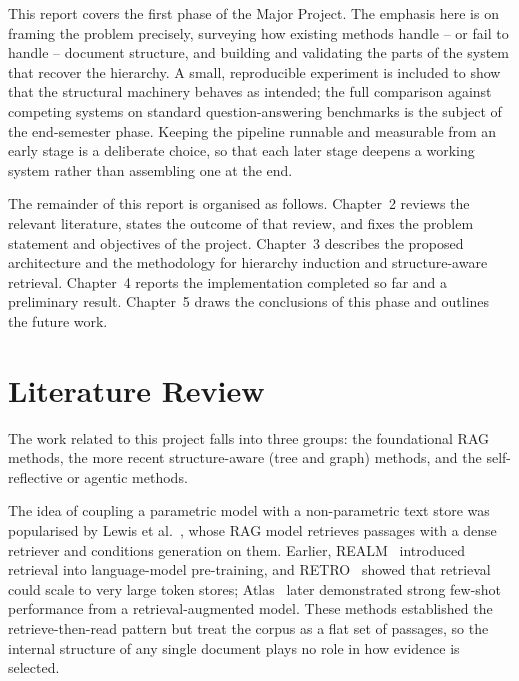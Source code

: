 \documentclass[12pt, a4paper, openright, twoside]{report}
\begin{document}
This report covers the first phase of the Major Project. The emphasis here is on framing the problem precisely, surveying how existing methods handle -- or fail to handle -- document structure, and building and validating the parts of the system that recover the hierarchy. A small, reproducible experiment is included to show that the structural machinery behaves as intended; the full comparison against competing systems on standard question-answering benchmarks is the subject of the end-semester phase. Keeping the pipeline runnable and measurable from an early stage is a deliberate choice, so that each later stage deepens a working system rather than assembling one at the end.

The remainder of this report is organised as follows. Chapter~2 reviews the relevant literature, states the outcome of that review, and fixes the problem statement and objectives of the project. Chapter~3 describes the proposed architecture and the methodology for hierarchy induction and structure-aware retrieval. Chapter~4 reports the implementation completed so far and a preliminary result. Chapter~5 draws the conclusions of this phase and outlines the future work.

\chapter{Literature Review}
\label{literaturereview}

The work related to this project falls into three groups: the foundational RAG methods, the more recent structure-aware (tree and graph) methods, and the self-reflective or agentic methods.

The idea of coupling a parametric model with a non-parametric text store was popularised by Lewis et al.~\cite{lewis}, whose RAG model retrieves passages with a dense retriever and conditions generation on them. Earlier, REALM~\cite{realm} introduced retrieval into language-model pre-training, and RETRO~\cite{retro} showed that retrieval could scale to very large token stores; Atlas~\cite{atlas} later demonstrated strong few-shot performance from a retrieval-augmented model. These methods established the retrieve-then-read pattern but treat the corpus as a flat set of passages, so the internal structure of any single document plays no role in how evidence is selected.
\end{document}
